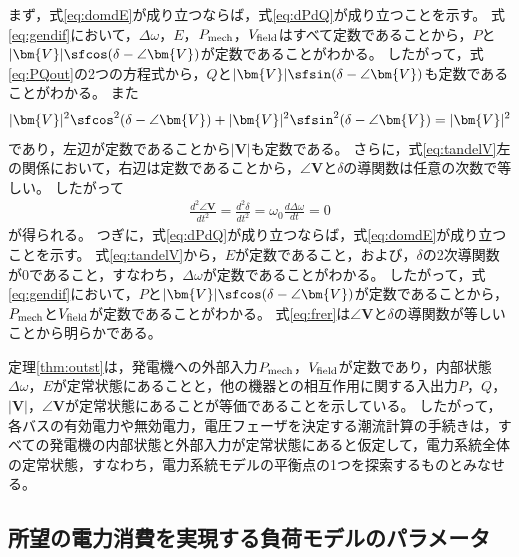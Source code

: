 \documentclass[tombow,dvipdfmx]{corona-a5}
\begin{document}
\begin{証明}
まず，式\ref{eq:domdE}が成り立つならば，式\ref{eq:dPdQ}が成り立つことを示す。
式\ref{eq:gendif}において，$\Delta \omega$，$E$，$P_{\rm mech}$，$V_{\rm field}$はすべて定数であることから，$P$と$|\bm{V}|\sfcos (\delta - \angle \bm{V})$が定数であることがわかる。
したがって，式\ref{eq:PQout}の2つの方程式から，$Q$と$|\bm{V}|\sfsin (\delta - \angle \bm{V})$も定数であることがわかる。
また
\begin{align*}
|\bm{V}|^2\sfcos^2 (\delta - \angle \bm{V}) +
|\bm{V}|^2\sfsin^2 (\delta - \angle \bm{V}) = |\bm{V}|^2
\end{align*}
であり，左辺が定数であることから$|\bm{V}|$も定数である。
さらに，式\ref{eq:tandelV}左の関係において，右辺は定数であることから，$\angle \bm{V}$と$\delta$の導関数は任意の次数で等しい。
したがって
\begin{align*}
\frac{d^2 \angle \bm{V}}{dt^2} = \frac{d^2 \delta}{dt^2} = \omega_0 \frac{d\Delta \omega}{dt} =0
\end{align*}
が得られる。
つぎに，式\ref{eq:dPdQ}が成り立つならば，式\ref{eq:domdE}が成り立つことを示す。
式\ref{eq:tandelV}から，$E$が定数であること，および，$\delta$の2次導関数が$0$であること，すなわち，$\Delta \omega$が定数であることがわかる。
したがって，式\ref{eq:gendif}において，$P$と$|\bm{V}|\sfcos (\delta - \angle \bm{V})$が定数であることから，$P_{\rm mech}$と$V_{\rm field}$が定数であることがわかる。
式\ref{eq:frer}は$\angle \bm{V}$と$\delta$の導関数が等しいことから明らかである。
\end{証明}

定理\ref{thm:outst}は，発電機への外部入力$P_{\rm mech}$，$V_{\rm field}$が定数であり，内部状態$\Delta \omega$，$E$が定常状態にあることと，他の機器との相互作用に関する入出力$P$，$Q$，$|\bm{V}|$，$\angle \bm{V}$が定常状態にあることが等価であることを示している。
したがって，各バスの有効電力や無効電力，電圧フェーザを決定する潮流計算の手続きは，すべての発電機の内部状態と外部入力が定常状態にあると仮定して，電力系統全体の定常状態，すなわち，電力系統モデルの平衡点の1つを探索するものとみなせる。

\subsection{所望の電力消費を実現する負荷モデルのパラメータ}\label{sec:loadpara}

\end{document}
